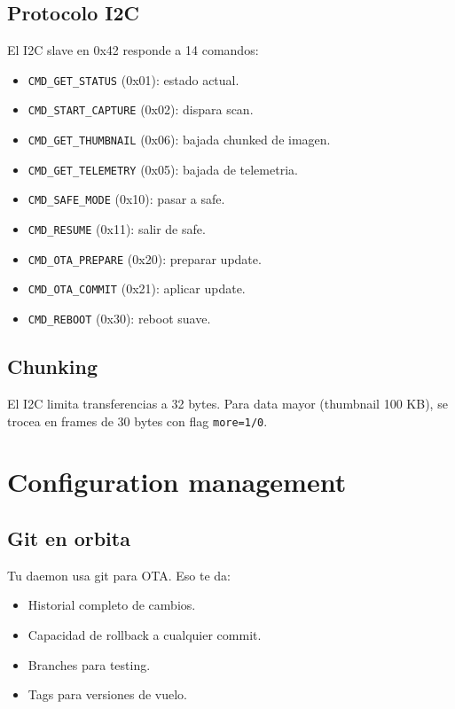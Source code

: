 \documentclass[11pt,a4paper,oneside,openright]{book}
\begin{document}
\section{Protocolo I2C}

El I2C slave en 0x42 responde a 14 comandos:

\begin{itemize}[leftmargin=2em]
  \item \texttt{CMD\_GET\_STATUS} (0x01): estado actual.
  \item \texttt{CMD\_START\_CAPTURE} (0x02): dispara scan.
  \item \texttt{CMD\_GET\_THUMBNAIL} (0x06): bajada chunked de imagen.
  \item \texttt{CMD\_GET\_TELEMETRY} (0x05): bajada de telemetria.
  \item \texttt{CMD\_SAFE\_MODE} (0x10): pasar a safe.
  \item \texttt{CMD\_RESUME} (0x11): salir de safe.
  \item \texttt{CMD\_OTA\_PREPARE} (0x20): preparar update.
  \item \texttt{CMD\_OTA\_COMMIT} (0x21): aplicar update.
  \item \texttt{CMD\_REBOOT} (0x30): reboot suave.
\end{itemize}

\section{Chunking}

El I2C limita transferencias a 32 bytes. Para data mayor (thumbnail
100 KB), se trocea en frames de 30 bytes con flag \texttt{more=1/0}.

\chapter{Configuration management}

\section{Git en orbita}

Tu daemon usa git para OTA. Eso te da:
\begin{itemize}[leftmargin=2em]
  \item Historial completo de cambios.
  \item Capacidad de rollback a cualquier commit.
  \item Branches para testing.
  \item Tags para versiones de vuelo.
\end{itemize}
\end{document}
